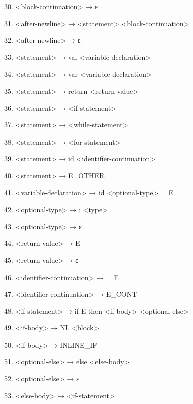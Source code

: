 \documentclass{article}
\begin{document}
30. \textless block-continuation\textgreater{} → ε

31. \textless after-newline\textgreater{} → \textless statement\textgreater{} \textless block-continuation\textgreater{}

32. \textless after-newline\textgreater{} → ε

33. \textless statement\textgreater{} → val \textless variable-declaration\textgreater{}

34. \textless statement\textgreater{} → var \textless variable-declaration\textgreater{}

35. \textless statement\textgreater{} → return \textless return-value\textgreater{}

36. \textless statement\textgreater{} → \textless if-statement\textgreater{}

37. \textless statement\textgreater{} → \textless while-statement\textgreater{}

38. \textless statement\textgreater{} → \textless for-statement\textgreater{}

39. \textless statement\textgreater{} → id \textless identifier-continuation\textgreater{}

40. \textless statement\textgreater{} → E\_OTHER

41. \textless variable-declaration\textgreater{} → id \textless optional-type\textgreater{} = E

42. \textless optional-type\textgreater{} → : \textless type\textgreater{}

43. \textless optional-type\textgreater{} → ε

44. \textless return-value\textgreater{} → E

45. \textless return-value\textgreater{} → ε

46. \textless identifier-continuation\textgreater{} → = E

47. \textless identifier-continuation\textgreater{} → E\_CONT

48. \textless if-statement\textgreater{} → if E then \textless if-body\textgreater{} \textless optional-else\textgreater{}

49. \textless if-body\textgreater{} → NL \textless block\textgreater{}

50. \textless if-body\textgreater{} → INLINE\_IF

51. \textless optional-else\textgreater{} → else \textless else-body\textgreater{}

52. \textless optional-else\textgreater{} → ε

53. \textless else-body\textgreater{} → \textless if-statement\textgreater{}
\end{document}
